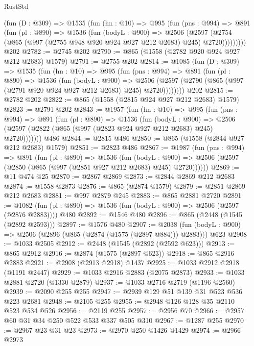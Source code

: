 \begin{lexlean}{RustStd}
\begin{coremodule}
      (fun (D : @309) =>
      @1535
        (fun (hn : @10) =>
        @995
          (fun (pns : @994) =>
          @891
            (fun (pl : @890) =>
            @1536
              (fun (bodyL : @900) =>
              @2506
                (@2597
                  (@2754 (@865 (@997 (@2755 @948 @920 @924 @927 @212 @2683) @245) @2720)))))))))
    @202
@2782 := @2745 @202
@2790 := @865 (@1558 (@2782 @920 @924 @927 @212 @2683) @1579)
@2791 := @2755 @202
@2814 := @1085
    (fun (D : @309) =>
    @1535
      (fun (hn : @10) =>
      @995
        (fun (pns : @994) =>
        @891
          (fun (pl : @890) =>
          @1536
            (fun (bodyL : @900) =>
            @2506 (@2597 (@2790 (@865 (@997 (@2791 @920 @924 @927 @212 @2683) @245) @2720))))))))
    @202
@2815 := @2782 @202
@2822 := @865 (@1558 (@2815 @924 @927 @212 @2683) @1579)
@2823 := @2791 @202
@2843 := @1957
    (fun (hn : @10) =>
    @995
      (fun (pns : @994) =>
      @891
        (fun (pl : @890) =>
        @1536
          (fun (bodyL : @900) =>
          @2506 (@2597 (@2822 (@865 (@997 (@2823 @924 @927 @212 @2683) @245) @2720)))))))
    @486
@2844 := @2815 @486
@2850 := @865 (@1558 (@2844 @927 @212 @2683) @1579)
@2851 := @2823 @486
@2867 := @1987
    (fun (pns : @994) =>
    @891
      (fun (pl : @890) =>
      @1536
        (fun (bodyL : @900) =>
        @2506 (@2597 (@2850 (@865 (@997 (@2851 @927 @212 @2683) @245) @2720))))))
@2869 := @11 @474 @25
@2870 := @2867 @2869
@2873 := @2844 @2869 @212 @2683
@2874 := @1558 @2873
@2876 := @865 (@2874 @1579)
@2879 := @2851 @2869 @212 @2683
@2881 := @997 @2879 @245
@2883 := @865 @2881 @2720
@2891 := @1082 (fun (pl : @890) => @1536 (fun (bodyL : @900) => @2506 (@2597 (@2876 @2883)))) @480
@2892 := @1546 @480
@2896 := @865 (@2448 (@1545 (@2892 @2593)))
@2897 := @1576 @480
@2907 := @2038 (fun (bodyL : @900) => @2506 (@2896 (@865 (@2874 (@1575 (@2897 @884))) @2883))) @623
@2908 := @1033 @2505
@2912 := @2448 (@1545 (@2892 (@2592 @623)))
@2913 := @865 @2912
@2916 := @2874 (@1575 (@2897 @623))
@2918 := @865 @2916 @2883
@2921 := @2908 (@2913 @2918) @1437
@2925 := @1033 @2912 @2918 (@1191 @2447)
@2929 := @1033 @2916 @2883 (@2075 @2873)
@2933 := @1033 @2881 @2720 (@1330 @2879)
@2937 := @1033 @2716 @2719 (@1196 @2560)
@2939 := @2090 @255 @255
@2947 := @2939 @129 @51 @139 @31 @523 @536 @223 @2681
@2948 := @2105 @255
@2955 := @2948 @126 @128 @35 @2110 @523 @534 @526
@2956 := @2119 @255
@2957 := @2956 @70
@2966 := @2957 @60 @31 @34 @250 @522 @533 @337 @505 @310
@2967 := @1287 @255
@2970 := @2967 @23 @31 @23
@2973 := @2970 @250 @1426 @1429
@2974 := @2966 @2973

\end{coremodule}
\end{lexlean}
